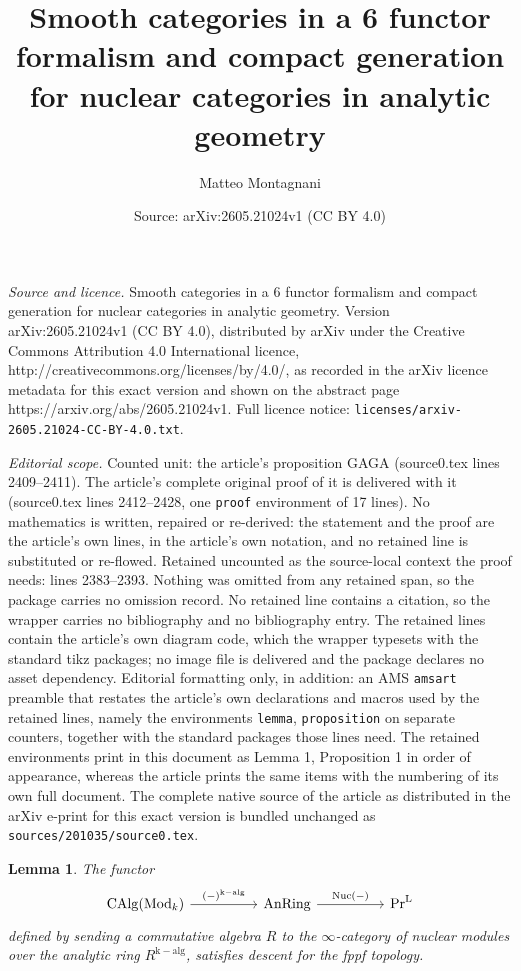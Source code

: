 \documentclass[10pt,a4paper]{amsart}
\title{Smooth categories in a 6 functor formalism and compact generation for nuclear categories in analytic geometry}
\author{Matteo Montagnani}
\date{Source: arXiv:2605.21024v1 (CC BY 4.0)}
\newtheorem{lemma}{Lemma}
\newcommand{\LPr}{\mathrm{Pr}^\rL}
\newcommand{\Mod}{\mathrm{Mod}}
\newcommand{\Nuc}{\mathrm{Nuc}}
\newcommand{\cat}{$\infty$-category }
\newcommand{\rL}{\mathrm L}
\begin{document}
\maketitle

\noindent\emph{Source and licence.} Smooth categories in a 6 functor formalism and compact generation for nuclear categories in analytic geometry. Version arXiv:2605.21024v1 (CC BY 4.0), distributed by arXiv under the Creative Commons Attribution 4.0 International licence, http://creativecommons.org/licenses/by/4.0/, as recorded in the arXiv licence metadata for this exact version and shown on the abstract page https://arxiv.org/abs/2605.21024v1. Full licence notice: \texttt{licenses/arxiv-2605.21024-CC-BY-4.0.txt}.\par\smallskip

\noindent\textit{Editorial scope.} Counted unit: the article's proposition GAGA (source0.tex lines 2409--2411). The article's complete original proof of it is delivered with it (source0.tex lines 2412--2428, one \texttt{proof} environment of 17 lines). No mathematics is written, repaired or re-derived: the statement and the proof are the article's own lines, in the article's own notation, and no retained line is substituted or re-flowed.  Retained uncounted as the source-local context the proof needs: lines 2383--2393.  Nothing was omitted from any retained span, so the package carries no omission record.  No retained line contains a citation, so the wrapper carries no bibliography and no bibliography entry.  The retained lines contain the article's own diagram code, which the wrapper typesets with the standard tikz packages; no image file is delivered and the package declares no asset dependency.  Editorial formatting only, in addition: an AMS \texttt{amsart} preamble that restates the article's own declarations and macros used by the retained lines, namely the environments \texttt{lemma}, \texttt{proposition} on separate counters, together with the standard packages those lines need.  The retained environments print in this document as Lemma 1, Proposition 1 in order of appearance, whereas the article prints the same items with the numbering of its own full document.  The complete native source of the article as distributed in the arXiv e-print for this exact version is bundled unchanged as \texttt{sources/201035/source0.tex}.
\begin{lemma}\label{lem: descent for discrete modules}
    The functor
    \begin{equation}\label{eq: discrete descent}
        \begin{tikzcd}
	{ \mathrm{CAlg}(\Mod_{k})} && {\mathrm{AnRing}} && \LPr
	\arrow["{(-)^{\mathrm{k-alg}}}", from=1-1, to=1-3]
	\arrow["{\Nuc(-)}", from=1-3, to=1-5]
\end{tikzcd}
    \end{equation}
    defined by sending a commutative algebra $R$ to the \cat of nuclear modules over the analytic ring $R^{\mathrm{k-alg}}$, satisfies descent for the fppf topology.
\end{lemma}
\end{document}
